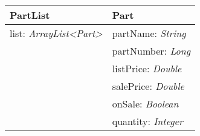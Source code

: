 \documentclass{report}
\begin{document}
\begin{center}
  \begin{tabular}{ | l | l | }
    \hline
    \textbf{PartList} & \textbf{Part} \\ \hline \hline
    list: \textit{ArrayList<Part>} & partName: \textit{String} \\ \hline
    & partNumber: \textit{Long} \\ \hline
    & listPrice: \textit{Double} \\ \hline
    & salePrice: \textit{Double} \\ \hline
    & onSale: \textit{Boolean} \\ \hline
    & quantity: \textit{Integer} \\ \hline
  \end{tabular}
\end{center}

\clearpage
\end{document}
